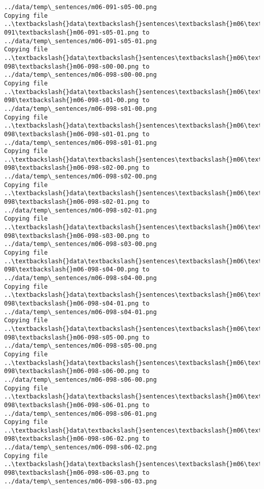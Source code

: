 \documentclass[11pt]{article}
\begin{document}
\begin{Verbatim}[commandchars=\\\{\}]
../data/temp\_sentences/m06-091-s05-00.png
Copying file ..\textbackslash{}data\textbackslash{}sentences\textbackslash{}m06\textbackslash{}m06-091\textbackslash{}m06-091-s05-01.png to
../data/temp\_sentences/m06-091-s05-01.png
Copying file ..\textbackslash{}data\textbackslash{}sentences\textbackslash{}m06\textbackslash{}m06-098\textbackslash{}m06-098-s00-00.png to
../data/temp\_sentences/m06-098-s00-00.png
Copying file ..\textbackslash{}data\textbackslash{}sentences\textbackslash{}m06\textbackslash{}m06-098\textbackslash{}m06-098-s01-00.png to
../data/temp\_sentences/m06-098-s01-00.png
Copying file ..\textbackslash{}data\textbackslash{}sentences\textbackslash{}m06\textbackslash{}m06-098\textbackslash{}m06-098-s01-01.png to
../data/temp\_sentences/m06-098-s01-01.png
Copying file ..\textbackslash{}data\textbackslash{}sentences\textbackslash{}m06\textbackslash{}m06-098\textbackslash{}m06-098-s02-00.png to
../data/temp\_sentences/m06-098-s02-00.png
Copying file ..\textbackslash{}data\textbackslash{}sentences\textbackslash{}m06\textbackslash{}m06-098\textbackslash{}m06-098-s02-01.png to
../data/temp\_sentences/m06-098-s02-01.png
Copying file ..\textbackslash{}data\textbackslash{}sentences\textbackslash{}m06\textbackslash{}m06-098\textbackslash{}m06-098-s03-00.png to
../data/temp\_sentences/m06-098-s03-00.png
Copying file ..\textbackslash{}data\textbackslash{}sentences\textbackslash{}m06\textbackslash{}m06-098\textbackslash{}m06-098-s04-00.png to
../data/temp\_sentences/m06-098-s04-00.png
Copying file ..\textbackslash{}data\textbackslash{}sentences\textbackslash{}m06\textbackslash{}m06-098\textbackslash{}m06-098-s04-01.png to
../data/temp\_sentences/m06-098-s04-01.png
Copying file ..\textbackslash{}data\textbackslash{}sentences\textbackslash{}m06\textbackslash{}m06-098\textbackslash{}m06-098-s05-00.png to
../data/temp\_sentences/m06-098-s05-00.png
Copying file ..\textbackslash{}data\textbackslash{}sentences\textbackslash{}m06\textbackslash{}m06-098\textbackslash{}m06-098-s06-00.png to
../data/temp\_sentences/m06-098-s06-00.png
Copying file ..\textbackslash{}data\textbackslash{}sentences\textbackslash{}m06\textbackslash{}m06-098\textbackslash{}m06-098-s06-01.png to
../data/temp\_sentences/m06-098-s06-01.png
Copying file ..\textbackslash{}data\textbackslash{}sentences\textbackslash{}m06\textbackslash{}m06-098\textbackslash{}m06-098-s06-02.png to
../data/temp\_sentences/m06-098-s06-02.png
Copying file ..\textbackslash{}data\textbackslash{}sentences\textbackslash{}m06\textbackslash{}m06-098\textbackslash{}m06-098-s06-03.png to
../data/temp\_sentences/m06-098-s06-03.png

\end{Verbatim}
\end{document}
